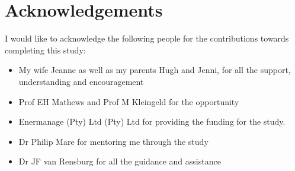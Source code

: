 \documentclass[12pt, english, oneside]{report}%
\renewcommand{\arraystretch}{1.4}
\begin{document}
{\tiny }\section*{Acknowledgements}
\thispagestyle{plain}
\vspace{0.2cm}
I would like to acknowledge the following people for the contributions towards completing this study:
\begin{itemize}
	\item My wife Jeanne as well as my parents Hugh and Jenni,  for all the support, understanding and encouragement 
	\item Prof EH Mathews and Prof M Kleingeld for the opportunity
	\item Enermanage (Pty) Ltd (Pty) Ltd for providing the funding for the study.
	\item Dr Philip Mare for mentoring me through the study
	\item Dr JF van Rensburg  for all the guidance and assistance
\end{itemize}

\clearpage

\tableofcontents

\clearpage

\renewcommand{\arraystretch}{1.2}
\linespread{1}
	\printglossary[type=\acronymtype]
	\newpage
	\printglossary[title=Nomenclature]
	\newpage
\renewcommand{\arraystretch}{1.4}
\linespread{1.4}

	\listoffigures
	\clearpage
	\listoftables









\glsaddall
\end{document}
